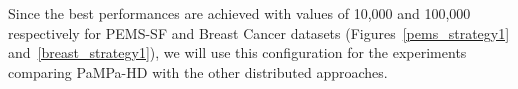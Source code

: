 Since the best performances are achieved with values of 10,000 and 100,000 respectively for PEMS-SF and Breast Cancer datasets (Figures~\ref{pems_strategy1} and~\ref{breast_strategy1}), we will use this configuration for the experiments comparing PaMPa-HD with the other distributed approaches.



